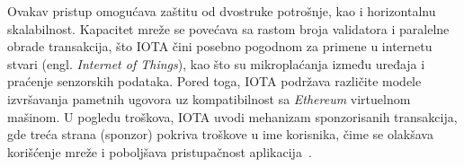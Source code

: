 Ovakav pristup omogućava zaštitu od dvostruke potrošnje, kao i horizontalnu skalabilnost. Kapacitet mreže se povećava sa rastom broja validatora i paralelne obrade transakcija, što IOTA čini posebno pogodnom za primene u internetu stvari (engl. \textit{Internet of Things}), kao što su mikroplaćanja između uređaja i praćenje senzorskih podataka. Pored toga, IOTA podržava različite modele izvršavanja pametnih ugovora uz kompatibilnost sa \textit{Ethereum} virtuelnom mašinom. U pogledu troškova, IOTA uvodi mehanizam sponzorisanih transakcija, gde treća strana (sponzor) pokriva troškove u ime korisnika, čime se olakšava korišćenje mreže i poboljšava pristupačnost aplikacija~\cite{blockeden DAG}.





